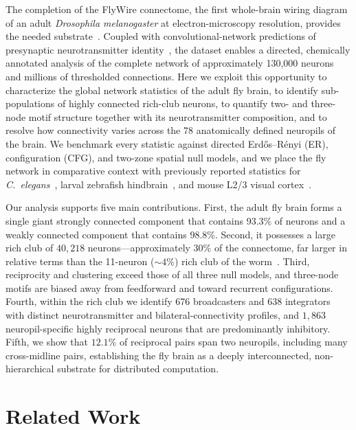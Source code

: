 \documentclass[11pt]{article}
\begin{document}
The completion of the FlyWire connectome, the first whole-brain wiring
diagram of an adult \textit{Drosophila melanogaster} at electron-microscopy
resolution, provides the needed
substrate~\cite{dorkenwald2024flywire,schlegel2024whole,turner2021automated}.
Coupled with convolutional-network predictions of presynaptic
neurotransmitter identity~\cite{eckstein2024neurotransmitter}, the dataset
enables a directed, chemically annotated analysis of the complete network
of approximately 130{,}000 neurons and millions of thresholded connections.
Here we exploit this opportunity to characterize the global network
statistics of the adult fly brain, to identify sub-populations of highly
connected rich-club neurons, to quantify two- and three-node motif structure
together with its neurotransmitter composition, and to resolve how
connectivity varies across the 78 anatomically defined neuropils of the
brain. We benchmark every statistic against directed Erd{\H o}s--R{\'e}nyi
(ER), configuration (CFG), and two-zone spatial null models, and we place
the fly network in comparative context with previously reported statistics
for \textit{C.\ elegans}~\cite{varshney2011structural,cook2019whole}, larval
zebrafish hindbrain~\cite{svara2022automated}, and mouse L2/3 visual
cortex~\cite{song2005highly}.

Our analysis supports five main contributions. First, the adult fly brain
forms a single giant strongly connected component that contains 93.3\% of
neurons and a weakly connected component that contains 98.8\%. Second, it
possesses a large rich club of $40{,}218$ neurons---approximately 30\% of
the connectome, far larger in relative terms than the 11-neuron
($\sim 4\%$) rich club of the worm~\cite{towlson2013rich}. Third,
reciprocity and clustering exceed those of all three null models, and
three-node motifs are biased away from feedforward and toward recurrent
configurations. Fourth, within the rich club we identify 676 broadcasters
and 638 integrators with distinct neurotransmitter and
bilateral-connectivity profiles, and $1{,}863$ neuropil-specific highly
reciprocal neurons that are predominantly inhibitory. Fifth, we show that
$12.1\%$ of reciprocal pairs span two neuropils, including many
cross-midline pairs, establishing the fly brain as a deeply
interconnected, non-hierarchical substrate for distributed computation.

\section{Related Work}
\end{document}
